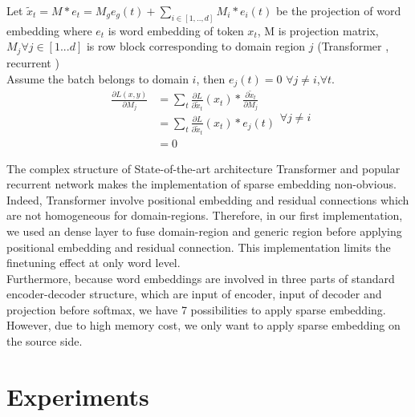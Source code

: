 \documentclass[11pt,a4paper]{article}
\newcommand{\fyTodo}[1]{\Todo[FY:]{\textcolor{orange}{#1}}}
\begin{document}
Let $\tilde{x}_{t} = M * e_{t} = M_g e_g(t) + \displaystyle{\mathop{\sum}_{i \in [1,..,d]} M_i * e_i(t)}$ be the projection of word embedding where $e_{t}$ is word embedding of token $x_{t}$, M is projection matrix, $M_j \forall j \in [1...d]$ is row block corresponding to domain region $j$ (Transformer \cite{Vaswani17attention}, recurrent \cite{bahdanau2014neural})\\
Assume the batch belongs to domain $i$, then $e_j(t) = 0$ $\forall j \neq i$,$\forall t$. 
\begin{equation}
\begin{split}
\frac{\partial L(x,y)}{\partial M_j} &= \sum_{t}\frac{\partial L}{\partial \tilde{x}_t}(x_t) * \frac{\partial \tilde{x}_t}{\partial M_j} \\
								&= \sum_{t} \frac{\partial L}{\partial \tilde{x}_t}(x_t) * e_j(t)\\
									&=0
\end{split} 
\forall j \neq i
\end{equation}

The complex structure of State-of-the-art architecture Transformer \cite{Vaswani17attention} and popular recurrent network \cite{bahdanau2014neural} makes the implementation of sparse embedding non-obvious. Indeed, Transformer involve positional embedding and residual connections which are not homogeneous for domain-regions. Therefore, in our first implementation, we used an dense layer to fuse domain-region and generic region before applying positional embedding and residual connection. This implementation limits the finetuning effect at only word level.\\
Furthermore, because word embeddings are involved in three parts of standard encoder-decoder structure, which are input of encoder, input of decoder and projection before softmax, we have 7 possibilities to apply sparse embedding. However, due to high memory cost, we only want to apply sparse embedding on the source side. \fyTodo{Explain this. Future work ?}

\section{Experiments \label{sec:experiments}}
\end{document}
